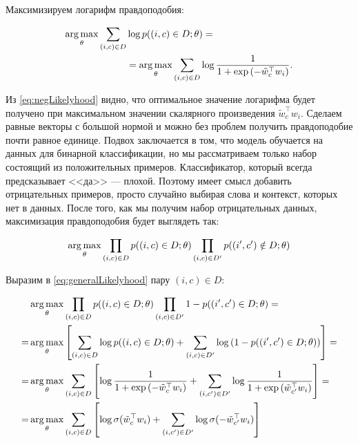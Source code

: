 Максимизируем логарифм правдоподобия:

\begin{equation} \label{eq:negLikelyhood}
\begin{aligned}
 \operatorname*{arg\,max}_{\theta} \sum_{(i,c)\in D} & \log{p((i,c)\in D;\theta)} = \\
 & = \operatorname*{arg\,max}_{\theta} \sum_{(i,c)\in D} \log{\frac{1}{1+\exp{(-\tilde{w}_c^{\top} w_i)}}}.
\end{aligned}
\end{equation}

Из \ref{eq:negLikelyhood} видно, что оптимальное значение логарифма будет получено при максимальном значении
скалярного произведения $\tilde{w}_c^{\top} w_i$. Сделаем равные векторы с большой нормой и можно без проблем
получить правдоподобие почти равное единице. Подвох заключается в том, что модель обучается на данных для
бинарной классификации, но мы рассматриваем только набор состоящий из положительных примеров. Классификатор,
который всегда предсказывает <<да>> --- плохой. Поэтому имеет смысл добавить отрицательных примеров, просто
случайно выбирая слова и контекст, которых нет в данных. После того, как мы получим набор отрицательных
данных, максимизация правдоподобия будет выглядеть так:

\begin{equation} \label{eq:generalLikelyhood}
 \operatorname*{arg\,max}_{\theta} \prod_{(i,c)\in D} p((i,c)\in D;\theta) \prod_{(i,c)\in D'} p((i',c')\notin D;\theta)
\end{equation}

Выразим в \ref{eq:generalLikelyhood} пару $(i,c) \in D$:

\begin{equation}
\begin{aligned}
 & \operatorname*{arg\,max}_{\theta} \prod_{(i,c)\in D} p((i,c)\in D;\theta) \prod_{(i,c)\in D'} 1-p((i',c')\in D;\theta) = \\
 = & \operatorname*{arg\,max}_{\theta} \left[\sum_{(i,c)\in D} \log{p((i,c)\in D;\theta)} + \sum_{(i,c)\in D'} \log{(
1-p((i',c')\in D;\theta))} \right] = \\
 = & \operatorname*{arg\,max}_{\theta} \sum_{(i,c)\in D} \left[\log{\frac{1}{1+\exp{(-\tilde{w}_c^{\top} w_i)}}} +
\sum_{(i,c')\in D'} \log{\frac{1}{1+\exp{(\tilde{w}_{c'}^{\top} w_i)}}} \right] = \\
 = & \operatorname*{arg\,max}_{\theta} \sum_{(i,c)\in D} \left[\log\sigma(\tilde{w}_c^{\top} w_i) + \sum_{(i,c')\in D'}
\log\sigma(-\tilde{w}_{c'}^{\top} w_i)\right]
\end{aligned}
\end{equation}

